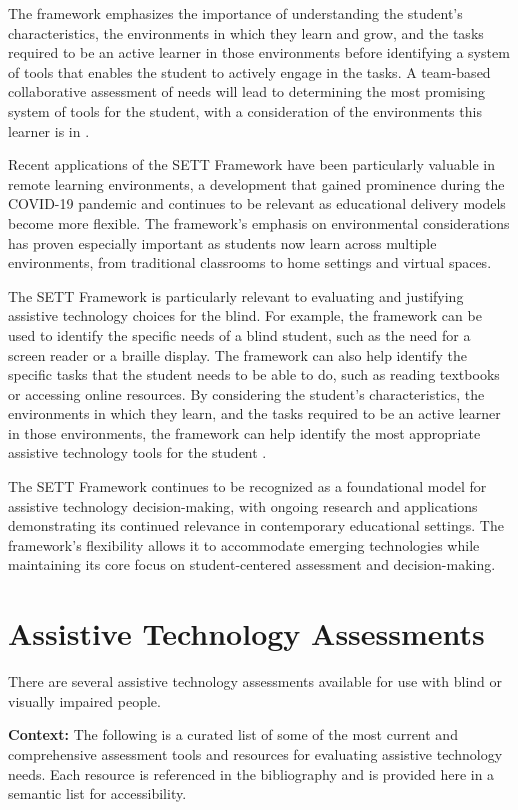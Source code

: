 The framework emphasizes the importance of understanding the student's characteristics, the environments in which they learn and grow, and the tasks required to be an active learner in those environments before identifying a system of tools that enables the student to actively engage in the tasks. A team-based collaborative assessment of needs will lead to determining the most promising system of tools for the student, with a consideration of the environments this learner is in \cite{Hollingshead2020}.

Recent applications of the SETT Framework have been particularly valuable in remote learning environments, a development that gained prominence during the COVID-19 pandemic and continues to be relevant as educational delivery models become more flexible. The framework's emphasis on environmental considerations has proven especially important as students now learn across multiple environments, from traditional classrooms to home settings and virtual spaces.

The SETT Framework is particularly relevant to evaluating and justifying assistive technology choices for the blind. For example, the framework can be used to identify the specific needs of a blind student, such as the need for a screen reader or a braille display. The framework can also help identify the specific tasks that the student needs to be able to do, such as reading textbooks or accessing online resources. By considering the student's characteristics, the environments in which they learn, and the tasks required to be an active learner in those environments, the framework can help identify the most appropriate assistive technology tools for the student \cite{Zabala2005, Zabala2018}.

The SETT Framework continues to be recognized as a foundational model for assistive technology decision-making, with ongoing research and applications demonstrating its continued relevance in contemporary educational settings. The framework's flexibility allows it to accommodate emerging technologies while maintaining its core focus on student-centered assessment and decision-making.

\section{Assistive Technology Assessments}\label{trouble4}
There are several assistive technology assessments available for use with blind or visually impaired people.

\noindent
\textbf{Context:} The following is a curated list of some of the most current and comprehensive assessment tools and resources for evaluating assistive technology needs. Each resource is referenced in the bibliography and is provided here in a semantic list for accessibility.

